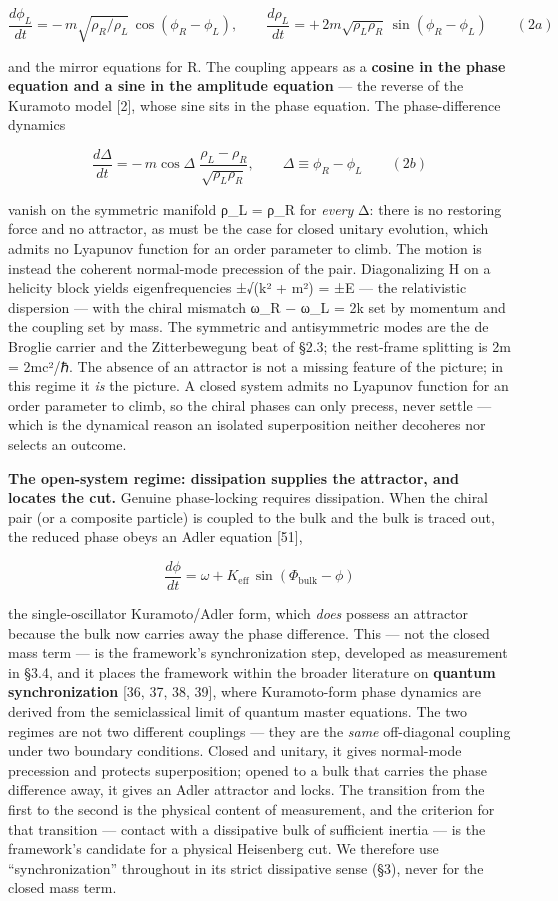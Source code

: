 \documentclass[
]{article}
\begin{document}
\[\frac{d\phi_L}{dt} = -\,m\sqrt{\rho_R/\rho_L}\,\cos(\phi_R - \phi_L), \qquad \frac{d\rho_L}{dt} = +\,2m\sqrt{\rho_L\rho_R}\,\sin(\phi_R - \phi_L) \qquad (2a)\]

and the mirror equations for R. The coupling appears as a \textbf{cosine
in the phase equation and a sine in the amplitude equation} --- the
reverse of the Kuramoto model {[}2{]}, whose sine sits in the phase
equation. The phase-difference dynamics

\[\frac{d\Delta}{dt} = -\,m\cos\Delta\;\frac{\rho_L - \rho_R}{\sqrt{\rho_L\rho_R}}, \qquad \Delta \equiv \phi_R - \phi_L \qquad (2b)\]

vanish on the symmetric manifold ρ\_L = ρ\_R for \emph{every} Δ: there
is no restoring force and no attractor, as must be the case for closed
unitary evolution, which admits no Lyapunov function for an order
parameter to climb. The motion is instead the coherent normal-mode
precession of the pair. Diagonalizing H on a helicity block yields
eigenfrequencies ±√(k² + m²) = ±E --- the relativistic dispersion ---
with the chiral mismatch ω\_R − ω\_L = 2\textbar k\textbar{} set by
momentum and the coupling set by mass. The symmetric and antisymmetric
modes are the de Broglie carrier and the Zitterbewegung beat of §2.3;
the rest-frame splitting is 2m = 2mc²/ℏ. The absence of an attractor is
not a missing feature of the picture; in this regime it \emph{is} the
picture. A closed system admits no Lyapunov function for an order
parameter to climb, so the chiral phases can only precess, never settle
--- which is the dynamical reason an isolated superposition neither
decoheres nor selects an outcome.

\textbf{The open-system regime: dissipation supplies the attractor, and
locates the cut.} Genuine phase-locking requires dissipation. When the
chiral pair (or a composite particle) is coupled to the bulk and the
bulk is traced out, the reduced phase obeys an Adler equation {[}51{]},

\[\frac{d\phi}{dt} = \omega + K_{\text{eff}}\,\sin(\Phi_{\text{bulk}} - \phi)\]

the single-oscillator Kuramoto/Adler form, which \emph{does} possess an
attractor because the bulk now carries away the phase difference. This
--- not the closed mass term --- is the framework's synchronization
step, developed as measurement in §3.4, and it places the framework
within the broader literature on \textbf{quantum synchronization} {[}36,
37, 38, 39{]}, where Kuramoto-form phase dynamics are derived from the
semiclassical limit of quantum master equations. The two regimes are not
two different couplings --- they are the \emph{same} off-diagonal
coupling under two boundary conditions. Closed and unitary, it gives
normal-mode precession and protects superposition; opened to a bulk that
carries the phase difference away, it gives an Adler attractor and
locks. The transition from the first to the second is the physical
content of measurement, and the criterion for that transition ---
contact with a dissipative bulk of sufficient inertia --- is the
framework's candidate for a physical Heisenberg cut. We therefore use
``synchronization'' throughout in its strict dissipative sense (§3),
never for the closed mass term.
\end{document}
